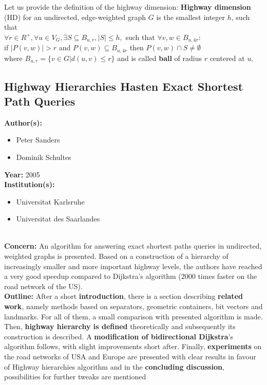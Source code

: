 \documentclass[a4paper]{article}
\newenvironment{itemizesp}
{
    \begin{itemize}
}
{
    \end{itemize}
}
\newcommand{\textbff}[1]{{\large \textbf{#1}}}
\begin{document}
        Let us provide the definition of the highway dimension: \def\defhd{\textbf{Highway dimension} (HD) for an undirected, edge-weighted graph $G$ is the smallest integer $h$, such that \\
        \hspace*{0.8cm}$\forall r \in R^{+}, \forall u \in V_{G}, \exists S \subseteq B_{u, r}, |S| \leq h,$ such that $\forall v, w \in B_{u, 4r}:$ \\
        \hspace*{1.6cm}if $|P(v, w)| > r$ and $P(v, w) \subseteq B_{u, 4r}$ then $P(v, w) \cap S \neq \emptyset$ \\
        \noindent where $B_{u, r} = \{v \in G | d(u, v) \leq r\}$ and is called \textbf{ball} of radius $r$ centered at $u$.} \defhd

        \subsection{Highway Hierarchies Hasten Exact Shortest Path Queries}
        \label{subsec:hwhierarchies}

        \textbff{Author(s): }
        \begin{itemizesp}
            \item Peter Sanders
            \item Dominik Schultes
        \end{itemizesp}
        \textbff{Year: }2005\\
        \textbff{Institution(s): }
        \begin{itemizesp}
            \item Universitat Karlsruhe
            \item Universitat des Saarlandes
        \end{itemizesp}
        {\hfill}\\
        \textbff{Concern:} An algorithm for answering exact shortest paths queries in undirected, weighted graphs is presented. Based on a construction of a hierarchy of increasingly smaller and more important highway levels, the authors have reached a very good speedup compared to Dijkstra's algorithm (2000 times faster on the road network of the US).\\

        \textbff{Outline:} After a short \textbf{introduction}, there is a section describing \textbf{related work}, namely methods based on separators, geometric containers, bit vectors and landmarks. For all of them, a small comparison with presented algorithm is made. Then, \textbf{highway hierarchy is defined} theoretically and subsequently its construction is described. A \textbf{modification of bidirectional Dijkstra}'s algorithm follows, with slight improvements short after. Finally, \textbf{experiments} on the road networks of USA and Europe are presented with clear results in favour of Highway hierarchies algorithm and in the \textbf{concluding discussion}, possibilities for further tweaks are mentioned\\
\end{document}
